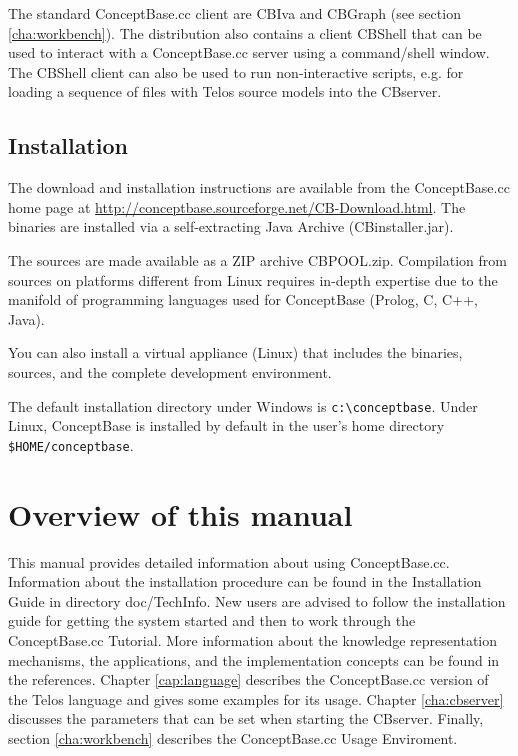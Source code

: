 The standard ConceptBase.cc client are CBIva and CBGraph (see section \ref{cha:workbench}).
The distribution also contains a client CBShell that can be used to
interact with a ConceptBase.cc server using a command/shell window.
The CBShell client can also be used to run non-interactive scripts,
e.g. for loading a sequence of files with Telos source models into
the CBserver.

\subsection{Installation}
\label{sec:installation}

The download and installation instructions are available from the
ConceptBase.cc home page at
 \url{http://conceptbase.sourceforge.net/CB-Download.html}.
The binaries are installed via a self-extracting Java Archive (CBinstaller.jar).

The sources are made available as a ZIP archive CBPOOL.zip. 
Compilation from sources on platforms different from Linux
requires in-depth expertise due to the manifold of programming languages
used for ConceptBase (Prolog, C, C++, Java).

You can also install a virtual appliance (Linux) that includes the binaries, sources,
and the complete development environment.

The default installation directory under Windows is {\tt c:\textbackslash conceptbase}. Under Linux,
ConceptBase is installed by default in the user's home directory
{\tt \$HOME/conceptbase}.



\section{Overview of this manual}
\label{sec:overview}

This manual provides detailed information about using ConceptBase.cc. Information about
the installation procedure can be found in the Installation Guide in
directory doc/TechInfo. New users are advised
to follow the installation guide for
getting the system started and then to work through the ConceptBase.cc
Tutorial. More information about the knowledge representation mechanisms,
the applications, and the implementation concepts can be found in the
references. Chapter \ref{cap:language} describes the ConceptBase.cc version of
the Telos language and gives some examples for its usage. Chapter
\ref{cha:cbserver} discusses the parameters that can be set
when starting the CBserver.
Finally, section
\ref{cha:workbench} describes the ConceptBase.cc Usage Enviroment.

